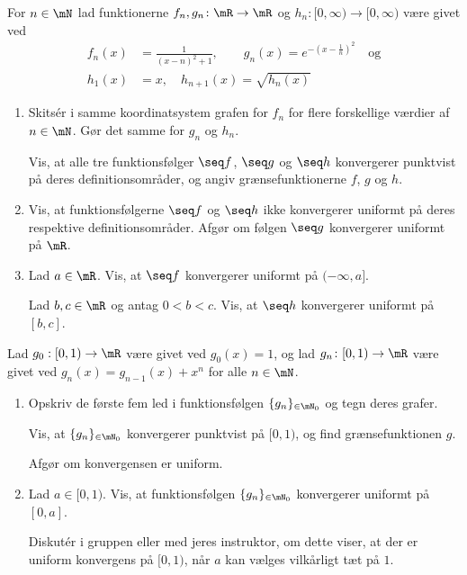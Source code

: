 \begin{opg}
For $n \in \mN$ lad funktionerne $f_n, g_n\colon \mR \to \mR$ og $h_n\colon [0, \infty) \to [0,\infty)$ være givet ved 
\begin{align*}
    f_n(x) &= \frac{1}{(x-n)^2+1}, \qquad 
    g_{n}(x)  =  e^{-\left(x-\frac{1}{n}\right)^2} \quad \text{og} \\
    h_1(x) &= x, \quad h_{n+1}(x) = \sqrt{h_n(x)} 
\end{align*}
\begin{enumerate}
    \item Skitsér i samme koordinatsystem grafen for $f_n$ for flere forskellige værdier af $n\in\mN$. Gør det samme for $g_n$ og $h_n$.
    
    Vis, at alle tre funktionsfølger $\seq f$, $\seq g$ og $\seq h$ konvergerer punktvist på deres  definitionsområder, og angiv grænsefunktionerne $f$, $g$ og $h$.
    
    
    \item Vis, at funktionsfølgerne $\seq f$ og $\seq h$ ikke konvergerer uniformt på deres respektive definitionsområder. Afgør om følgen $\seq g$ konvergerer uniformt på $\mR$.

    \item Lad $a\in\mR$. Vis, at $\seq f$ konvergerer uniformt på $(-\infty, a]$. 
    
    Lad $b,c\in\mR$ og antag $0 < b < c$. Vis, at $\seq h$ konvergerer uniformt på $[b,c]$. 
\end{enumerate} 
\end{opg}

\begin{opg}
Lad $g_0: [0,1) \to \mR$ være givet ved $g_0(x)=1$, og lad $g_n\colon [0,1) \to \mR$ være givet ved $g_n(x)=g_{n-1}(x)+x^{n}$ for alle $n \in \mN$. 
	
\begin{enumerate}
	\item Opskriv de første fem led i funktionsfølgen $\{g_n\}_{ \in \mN_0}$ og tegn deres grafer. 
    
    Vis, at $\{g_n\}_{ \in \mN_0}$ konvergerer punktvist på $[0,1)$, og find grænsefunktionen $g$. 

    Afgør om konvergensen er uniform.
	
	\item Lad $a \in [0,1)$. Vis, at funktionsfølgen $\{g_n\}_{ \in \mN_0}$ konvergerer uniformt på $[0,a]$. 
	
	Diskutér i gruppen eller med jeres instruktor, om dette viser, at der er uniform konvergens på $[0,1)$, når $a$ kan vælges vilkårligt tæt på $1$.
\end{enumerate}
\end{opg}


